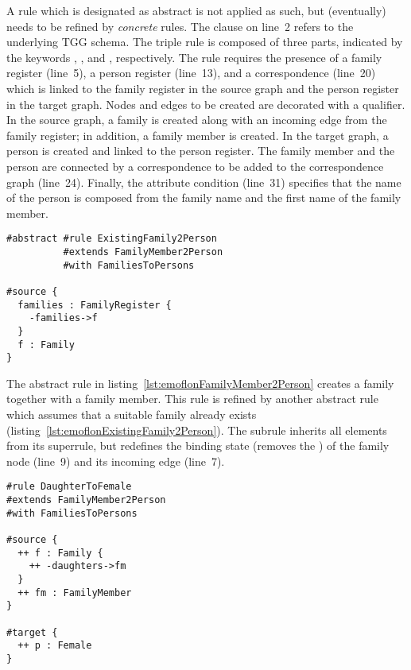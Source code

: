 A rule which is designated as abstract is not applied as such, but (eventually) needs to be refined by \emph{concrete} rules.
The  clause on line~2 refers to the underlying TGG schema.
The triple rule is composed of three parts, indicated by the keywords , , and , respectively. The rule requires the presence of a family register (line~5), a person register (line~13), and a correspondence (line~20) which is linked to the family register in the source graph and the person register in the target graph. Nodes and edges to be created are decorated with a \code{++} qualifier. In the source graph, a family is created along with an incoming edge from the family register; in addition, a family member is created. In the target graph, a person is created and linked to the person register. The family member and the person are connected by a correspondence to be added to the correspondence graph (line~24).
Finally, the attribute condition (line~31) specifies that the name of the person is composed from the family name and the first name of the family member.

\begin{lstlisting}[label={lst:emoflonExistingFamily2Person}, float=tb!, language=emoflon, caption={Mapping members in existing families to persons}]
#abstract #rule ExistingFamily2Person 
          #extends FamilyMember2Person 
          #with FamiliesToPersons

#source { 
  families : FamilyRegister {
    -families->f
  }
  f : Family
}
\end{lstlisting}

The abstract rule in listing~\ref{lst:emoflonFamilyMember2Person} creates a family together with a family member.
This rule is refined by another abstract rule which assumes that a suitable family already exists (listing~\ref{lst:emoflonExistingFamily2Person}).
The subrule inherits all elements from its superrule, but redefines the binding state (removes the \code{++}) of the family node (line~9) and its incoming edge (line~7).

\begin{lstlisting}[label={lst:emoflonDaughterToFemale}, float=tb!, language=emoflon, caption={Mapping daughters to female persons}]
#rule DaughterToFemale 
#extends FamilyMember2Person 
#with FamiliesToPersons

#source { 
  ++ f : Family {
    ++ -daughters->fm
  }
  ++ fm : FamilyMember
}

#target {
  ++ p : Female
}
\end{lstlisting}

